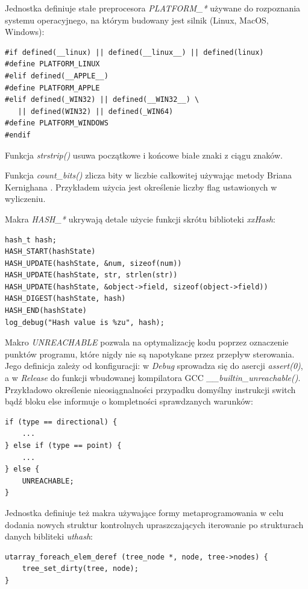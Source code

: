 Jednostka definiuje stałe preprocesora \textit{PLATFORM\_*} używane do rozpoznania systemu operacyjnego, na którym budowany jest silnik (Linux, MacOS, Windows):
\lstset{language=C}
\begin{lstlisting}[caption={Stałe preprocesora używane do rozpoznania systemu operacyjnego},captionpos=b]
#if defined(__linux) || defined(__linux__) || defined(linux)
#define PLATFORM_LINUX
#elif defined(__APPLE__)
#define PLATFORM_APPLE
#elif defined(_WIN32) || defined(__WIN32__) \
   || defined(WIN32) || defined(_WIN64)
#define PLATFORM_WINDOWS
#endif
\end{lstlisting}

Funkcja \textit{strstrip()} usuwa początkowe i końcowe białe znaki z ciągu znaków.

Funkcja \textit{count\_bits()} zlicza bity w liczbie całkowitej używając metody Briana Kernighana \cite{BITTWIDDLINGHACKS}. Przykładem użycia jest określenie liczby flag ustawionych w wyliczeniu.

Makra \textit{HASH\_*} ukrywają detale użycie funkcji skrótu biblioteki \textit{xxHash}:
\lstset{language=C}
\begin{lstlisting}[caption={Przykład użycia funkcji skrótu},captionpos=b]
hash_t hash;
HASH_START(hashState)
HASH_UPDATE(hashState, &num, sizeof(num))
HASH_UPDATE(hashState, str, strlen(str))
HASH_UPDATE(hashState, &object->field, sizeof(object->field))
HASH_DIGEST(hashState, hash)
HASH_END(hashState)
log_debug("Hash value is %zu", hash);
\end{lstlisting}

Makro \textit{UNREACHABLE} pozwala na optymalizację kodu poprzez oznaczenie punktów programu, które nigdy nie są napotykane przez przepływ sterowania.
Jego definicja zależy od konfiguracji: w \textit{Debug} sprowadza się do asercji \textit{assert(0)}, a w \textit{Release} do funkcji wbudowanej kompilatora GCC \textit{\_\_builtin\_unreachable()}.
Przykładowo określenie nieosiągnalności przypadku domyślny instrukcji switch bądź bloku else informuje o
kompletności sprawdzanych warunków:
\lstset{language=C}
\begin{lstlisting}[caption={Przykład użycia makra UNREACHABLE},captionpos=b]
if (type == directional) {
	...
} else if (type == point) {
	...
} else {
	UNREACHABLE;
}
\end{lstlisting}

Jednostka definiuje też makra używające formy metaprogramowania w celu dodania nowych struktur kontrolnych \cite{METACONTROLC} upraszczających iterowanie po strukturach danych bibliteki \textit{uthash}:
\lstset{language=C}
\begin{lstlisting}[caption={Przykład iteracji używając makra utarray\_foreach\_elem\_deref},captionpos=b]
utarray_foreach_elem_deref (tree_node *, node, tree->nodes) {
	tree_set_dirty(tree, node);
}
\end{lstlisting}


